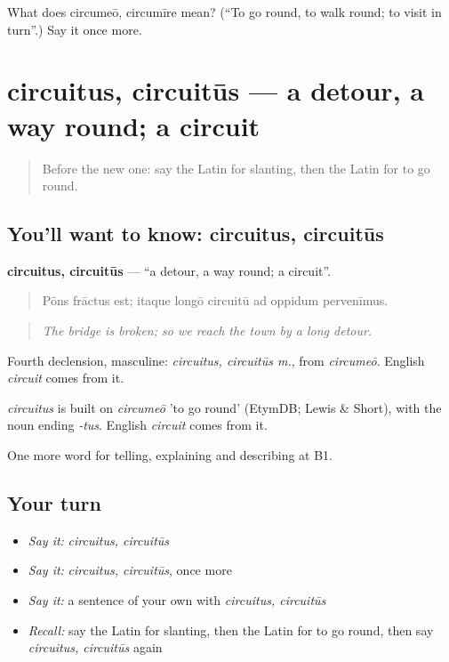 \begin{tcolorbox}[breakable,colback=teal!4,colframe=teal!35!black,title={Before you move on}]
What does circumeō, circumīre mean? (\textquotedblleft{}To go round, to walk round; to visit in turn\textquotedblright{}.) Say it once more.
\end{tcolorbox}
\section[circuitus, circuitūs]{circuitus, circuitūs — a detour, a way round; a circuit}

\label{lesson:LA-C454-circuitus}



\begin{quote}
Before the new one: say the Latin for slanting, then the Latin for to go round.
\end{quote}

\subsection*{You'll want to know: circuitus, circuitūs}
\textbf{circuitus, circuitūs} — \textquotedblleft{}a detour, a way round; a circuit\textquotedblright{}.

\begin{quote}
Pōns frāctus est; itaque longō circuitū ad oppidum pervenīmus.
\end{quote}

\begin{quote}
\emph{The bridge is broken; so we reach the town by a long detour.}
\end{quote}

Fourth declension, masculine: \emph{circuitus, circuitūs m.}, from \emph{circumeō}. English \emph{circuit} comes from it.

\begin{cousinweb}
\emph{circuitus} is built on \emph{circumeō} 'to go round' (EtymDB; Lewis \& Short), with the noun ending \emph{-tus}. English \emph{circuit} comes from it.
\end{cousinweb}

\begin{grammarlens}[title={What you've built}]
One more word for telling, explaining and describing at B1.
\end{grammarlens}

\subsection*{Your turn}
\begin{itemize}
\raggedright
  \item \emph{Say it:} \emph{circuitus, circuitūs}
  \item \emph{Say it:} \emph{circuitus, circuitūs}, once more
  \item \emph{Say it:} a sentence of your own with \emph{circuitus, circuitūs}
  \item \emph{Recall:} say the Latin for slanting, then the Latin for to go round, then say \emph{circuitus, circuitūs} again
\end{itemize}

